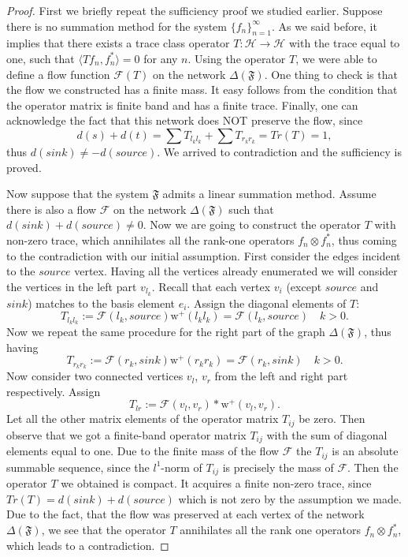 \documentclass[12pt]{article}
\newcommand\inner[2]{\langle #1, #2 \rangle}
\renewcommand{\cal}[1]{\mathcal{#1}}
\theoremstyle{definition}
\newcommand{\seq}[1]{\{{#1}_n\}_{n=1}^\infty}
\newcommand{\fsys}{\mathfrak{F}}
\newcommand{\wtp}{\mathrm{w}^{+}}
\newcommand{\flow}{\mathcal{F}}
\newcommand{\flowsgn}{\flow}
\newcommand{\source}{\mathit{source}}
\newcommand{\sink}{\mathit{sink}}
\newcommand{\net}{\Delta}
\numberwithin{remark}{section}
\numberwithin{theorem}{section}
\numberwithin{prop}{section}
\numberwithin{equation}{section}
\numberwithin{lemma}{section}
\numberwithin{prop_under_lemma}{lemma}
\begin{document}
    \begin{proof}
      First we briefly repeat the sufficiency proof we studied earlier.
      Suppose there is no summation method for the system $\seq{f}$.
      As we said before, it implies that there exists a trace class operator $T : \cal{H} \to \cal{H}$ with
      the trace equal to one, such that $\inner{Tf_n}{f_n^*} = 0$ for any $n$.
      Using the operator $T$, we were able to define a flow function $\flow(T)$ on the network
      $\net(\fsys)$.
      One thing to check is that the flow we constructed has a finite mass.
      It easy follows from the condition that the operator matrix is finite band and has a finite trace.
      Finally, one can acknowledge the fact that this network does NOT preserve the flow, since
      $$
        d(s) + d(t) = \sum T_{l_k l_k} + \sum T_{r_k r_k} = Tr(T) = 1,
      $$
      thus $d(\sink) \neq -d(\source)$.
      We arrived to contradiction and the sufficiency is proved.

      Now suppose that the system $\fsys$ admits a linear summation method.
      Assume there is also a flow $\flow$ on the network $\net(\fsys)$ such that $d(\sink) + d(\source) \neq 0$.
      Now we are going to construct the operator $T$ with non-zero trace, which annihilates all the rank-one
      operators $f_n \otimes f^*_n$, thus coming to the contradiction with our initial assumption.
      First consider the edges incident to the $\source$ vertex.
      Having all the vertices already enumerated we will consider the vertices in the left part $v_{l_k}$.
      Recall that each vertex $v_i$ (except $\source$ and $\sink$) matches to the basis element $e_i$.
      Assign the diagonal elements of $T$:
      $$
        T_{l_k l_k} := \flow(l_k, \source) \wtp(l_k l_k) = \flow(l_k, \source) \quad k > 0.
      $$
      Now we repeat the same procedure for the right part of the graph $\net(\fsys)$, thus having
      $$
        T_{r_k r_k} := \flow(r_k, \sink) \wtp(r_k r_k) = \flow(r_k, \sink) \quad k > 0.
      $$
      Now consider two connected vertices $v_l$, $v_r$ from the left and right part
      respectively. Assign
      $$
        T_{lr} := \flowsgn(v_l, v_r) * \wtp(v_l, v_r).
      $$
      Let all the other matrix elements of the operator matrix $T_{ij}$ be zero.
      Then observe that we got a finite-band operator matrix $T_{ij}$ with the sum of diagonal elements
      equal to one.
      Due to the finite mass of the flow $\flow$ the $T_{ij}$ is an absolute summable sequence, since the 
        $l^1$-norm of $T_{ij}$ is precisely the mass of $\flow$.
      Then the operator $T$ we obtained is compact.
      It acquires a finite non-zero trace, since $Tr(T) = d(\sink) + d(\source)$ which is not zero
        by the assumption we made.
      Due to the fact, that the flow was preserved at each vertex of the network $\net(\fsys)$,
        we see that the operator $T$ annihilates all the rank one operators $f_n \otimes f^*_n$,
        which leads to a contradiction.
    \end{proof}
    
\end{document}
